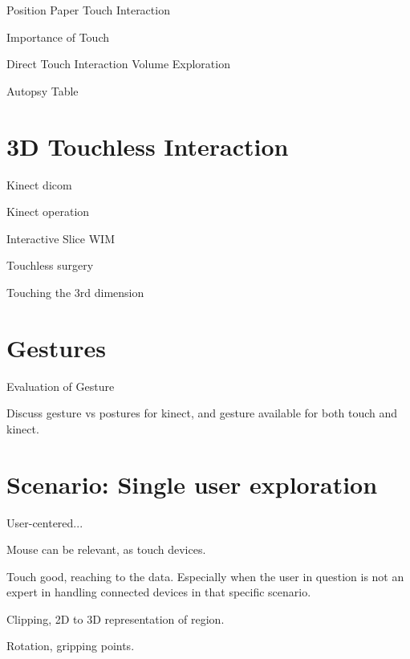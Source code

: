 \documentclass[review,journal]{vgtc}         %
\begin{document}
Position Paper Touch Interaction \cite{isenberg:hal-00781512}

Importance of Touch \cite{Robles-De-La-Torre:2006:IST:1158827.1159097}

Direct Touch Interaction Volume Exploration \cite{Klein:2012:DSD:2322389.2322403}

Autopsy Table \cite{LRFPY11}

\section{3D Touchless Interaction}

Kinect dicom \cite{zora82163}

Kinect operation \cite{OHaraGSPVMCCRDC14}

Interactive Slice WIM \cite{Coffey:2012:ISW:2360744.2360843}

Touchless surgery \cite{Mentis:2012:IPI:2207676.2208536}

Touching the 3rd dimension \cite{DBLP:journals/dagstuhl-reports/KeefeKSR12}

\section{Gestures}

Evaluation of Gesture \cite{Kirmizibayrak:2011:EGB:2087756.2087764}

Discuss gesture vs postures \cite{isenberg:hal-00781237} for kinect, and gesture available for both touch and kinect.

\section{Scenario: Single user exploration}

User-centered...

Mouse can be relevant, as touch devices.

Touch good, reaching to the data. Especially when the user in question is not an expert in handling connected devices in that specific scenario.

Clipping, 2D to 3D representation of region.

Rotation, gripping points.
\end{document}
